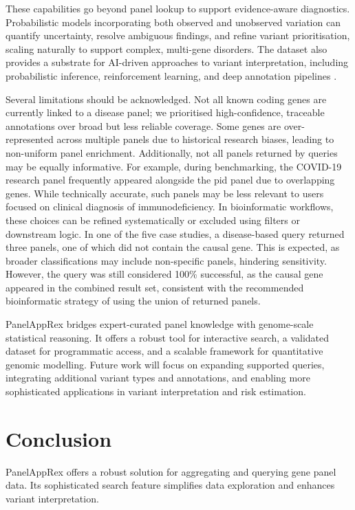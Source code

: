 These capabilities go beyond panel lookup to support evidence-aware diagnostics. 
Probabilistic models incorporating both observed and unobserved variation can quantify uncertainty, resolve ambiguous findings, and refine variant prioritisation, scaling naturally to support complex, multi-gene disorders. 
The dataset also provides a substrate for AI-driven approaches to variant interpretation, including probabilistic inference, reinforcement learning, and deep annotation pipelines
\cite{jumper_highly_2021, cheng_accurate_2023}.

Several limitations should be acknowledged. Not all known coding genes are currently linked to a disease panel; we prioritised high-confidence, traceable annotations over broad but less reliable coverage. 
Some genes are over-represented across multiple panels due to historical research biases, leading to non-uniform panel enrichment. 
Additionally, not all panels returned by queries may be equally informative. 
For example, during benchmarking, the COVID-19 research panel frequently appeared alongside the \ac{pid} panel due to overlapping genes. 
While technically accurate, such panels may be less relevant to users focused on clinical  diagnosis of immunodeficiency.
In bioinformatic workflows, these choices can be refined systematically or excluded using filters or downstream logic.
In one of the five case studies, a disease-based query returned three panels, one of which did not contain the causal gene. This is expected, as broader classifications may include non-specific panels, hindering sensitivity. However, the query was still considered 100\% successful, as the causal gene appeared in the combined result set, consistent with the recommended bioinformatic strategy of using the union of returned panels.

PanelAppRex bridges expert-curated panel knowledge with genome-scale statistical reasoning. 
It offers a robust tool for interactive search, a validated dataset for programmatic access, and a scalable framework for quantitative genomic modelling. 
Future work will focus on expanding supported queries, integrating additional variant types and annotations, and enabling more sophisticated applications in variant interpretation and risk estimation.

\section{Conclusion}
\noindent
PanelAppRex offers a robust solution for aggregating and querying gene panel data. Its sophisticated search feature simplifies data exploration and enhances variant interpretation. 

